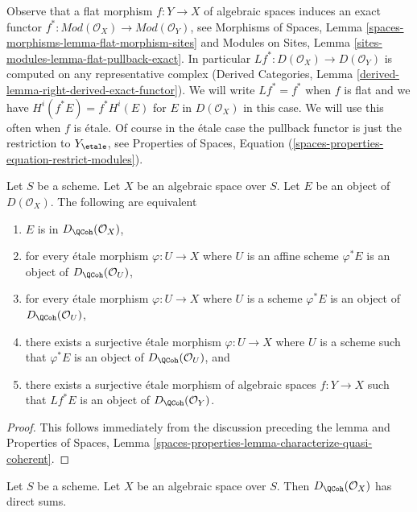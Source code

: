 \medskip\noindent
Observe that a flat morphism $f : Y \to X$ of algebraic spaces
induces an exact functor
$f^* : \textit{Mod}(\mathcal{O}_X) \to \textit{Mod}(\mathcal{O}_Y)$,
see
Morphisms of Spaces, Lemma \ref{spaces-morphisms-lemma-flat-morphism-sites}
and
Modules on Sites, Lemma \ref{sites-modules-lemma-flat-pullback-exact}.
In particular $Lf^* : D(\mathcal{O}_X) \to D(\mathcal{O}_Y)$
is computed on any representative complex
(Derived Categories, Lemma \ref{derived-lemma-right-derived-exact-functor}).
We will write $Lf^* = f^*$ when $f$ is flat and we have
$H^i(f^*E) = f^*H^i(E)$ for $E$ in $D(\mathcal{O}_X)$ in this case.
We will use this often when $f$ is \'etale. Of course in the \'etale
case the pullback functor is just the restriction to $Y_\etale$,
see Properties of Spaces, Equation
(\ref{spaces-properties-equation-restrict-modules}).

\begin{lemma}
\label{lemma-check-quasi-coherence-on-covering}
Let $S$ be a scheme. Let $X$ be an algebraic space over $S$.
Let $E$ be an object of $D(\mathcal{O}_X)$. The following are equivalent
\begin{enumerate}
\item $E$ is in $D_\QCoh(\mathcal{O}_X)$,
\item for every \'etale morphism $\varphi : U \to X$ where $U$ is an
affine scheme $\varphi^*E$ is an object of
$D_\QCoh(\mathcal{O}_U)$,
\item for every \'etale morphism $\varphi : U \to X$ where $U$ is a scheme
$\varphi^*E$ is an object of
$D_\QCoh(\mathcal{O}_U)$,
\item there exists a surjective \'etale morphism $\varphi : U \to X$
where $U$ is a scheme such that $\varphi^*E$ is an object of
$D_\QCoh(\mathcal{O}_U)$, and
\item there exists a surjective \'etale morphism of algebraic spaces
$f : Y \to X$ such that $Lf^*E$ is an object of
$D_\QCoh(\mathcal{O}_Y)$.
\end{enumerate}
\end{lemma}

\begin{proof}
This follows immediately from the discussion preceding the lemma and
Properties of Spaces, Lemma
\ref{spaces-properties-lemma-characterize-quasi-coherent}.
\end{proof}

\begin{lemma}
\label{lemma-quasi-coherence-direct-sums}
Let $S$ be a scheme. Let $X$ be an algebraic space over $S$.
Then $D_\QCoh(\mathcal{O}_X)$ has direct sums.
\end{lemma}

